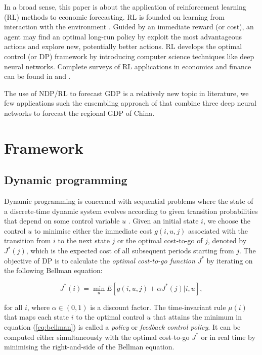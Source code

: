 In a broad sense, this paper is about the application of reinforcement learning (RL) methods to economic forecasting. RL is founded on learning from interaction with the environment \citep{Sutton2018}. Guided by an immediate reward (or cost), an agent may find an optimal long-run policy by exploit the most advantageous actions and explore new, potentially better actions. RL develops the optimal control (or DP) framework by introducing computer science techniques like deep neural networks. Complete surveys of RL applications in economics and finance can be found in \citet{Charpentier2021} and \citet{Meng2019}.

The use of NDP/RL to forecast GDP is a relatively new topic in literature, we few applications such the ensembling approach of \citet{Li2022} that combine three deep neural networks to forecast the regional GDP of China.  


\section{Framework}
\label{sec:framework}

\subsection{Dynamic programming}

Dynamic programming is concerned with sequential problems where the state of a discrete-time dynamic system evolves according to given transition probabilities that depend on some control variable $u$ \citep[chapter 1]{Bertsekas1996}. Given an initial state $i$, we choose the control $u$ to minimise either the immediate cost $g(i,u,j)$ associated with the transition from $i$ to the next state $j$ or the optimal cost-to-go of $j$, denoted by $J^*(j)$, which is the expected cost of all subsequent periods starting from $j$. The objective of DP is to calculate the \emph{optimal cost-to-go function} $J^*$ by iterating on the following Bellman equation:

\begin{equation}
	J^*(i) = \min_{u} E \left[ g(i,u,j) + \alpha J^*(j) | i,u \right],
	\label{eq:bellman}
\end{equation}

\noindent for all $i$, where $\alpha \in (0,1)$ is a discount factor. The time-invariant rule $\mu(i)$ that maps each state $i$ to the optimal control $u$ that attains the minimum in equation (\ref{eq:bellman}) is called a \emph{policy} or \emph{feedback control policy}. It can be computed either simultaneously with the optimal cost-to-go $J^*$ or in real time by minimising the right-and-side of the Bellman equation.


